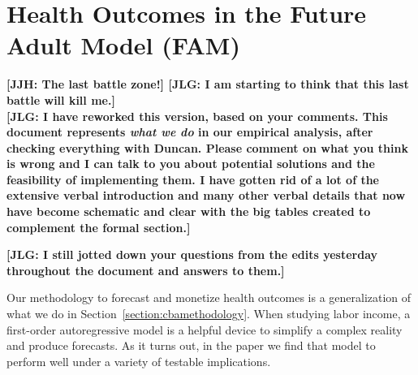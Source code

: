 \section{Health Outcomes in the Future Adult Model (FAM)} \label{appendix:health}

\noindent \textbf{[JJH: The last battle zone!] [JLG: I am starting to think that this last battle will kill me.]}\\

\noindent \textbf{[JLG: I have reworked this version, based on your comments. This document represents \textit{what we do} in our empirical analysis, after checking everything with Duncan. Please comment on what you think is wrong and I can talk to you about potential solutions and the feasibility of implementing them. I have gotten rid of a lot of the extensive verbal introduction and many other verbal details that now have become schematic and clear with the big tables created to complement the formal section.]} 

\textbf{[JLG: I still jotted down your questions from the edits yesterday throughout the document and answers to them.]}

Our methodology to forecast and monetize health outcomes is a generalization of what we do in Section~\ref{section:cbamethodology}. When studying labor income, a first-order autoregressive model is a helpful device to simplify a complex reality and produce forecasts. As it turns out, in the paper we find that model to perform well under a variety of testable implications. 

